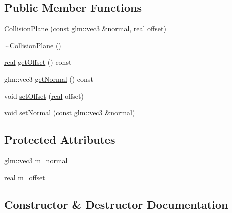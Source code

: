 \subsection*{Public Member Functions}
\begin{DoxyCompactItemize}
\item 
\mbox{\hyperlink{classrum_1_1_collision_plane_acb1374bc8962e6f0e14a93c041ade93f}{Collision\+Plane}} (const glm\+::vec3 \&normal, \mbox{\hyperlink{namespacerum_a7e8cca23573d5eaead0f138cbaa4862c}{real}} offset)
\item 
\mbox{\hyperlink{classrum_1_1_collision_plane_aed3fc45bbe236d0e3674745ed511ea14}{$\sim$\+Collision\+Plane}} ()
\item 
\mbox{\hyperlink{namespacerum_a7e8cca23573d5eaead0f138cbaa4862c}{real}} \mbox{\hyperlink{classrum_1_1_collision_plane_a348709c5d226023ce51d17a0fdfbe408}{get\+Offset}} () const
\item 
glm\+::vec3 \mbox{\hyperlink{classrum_1_1_collision_plane_a699fae9d74e6e19c4e30870d538c3a71}{get\+Normal}} () const
\item 
void \mbox{\hyperlink{classrum_1_1_collision_plane_aeaa1d14df4d33c30a7495e72ff5fa454}{set\+Offset}} (\mbox{\hyperlink{namespacerum_a7e8cca23573d5eaead0f138cbaa4862c}{real}} offset)
\item 
void \mbox{\hyperlink{classrum_1_1_collision_plane_ade1d578943c87eba3f49134f6e19148d}{set\+Normal}} (const glm\+::vec3 \&normal)
\end{DoxyCompactItemize}
\subsection*{Protected Attributes}
\begin{DoxyCompactItemize}
\item 
glm\+::vec3 \mbox{\hyperlink{classrum_1_1_collision_plane_aa2f3d73f116cb6965cd561f25ea4b67e}{m\+\_\+normal}}
\item 
\mbox{\hyperlink{namespacerum_a7e8cca23573d5eaead0f138cbaa4862c}{real}} \mbox{\hyperlink{classrum_1_1_collision_plane_a0630544f46ad1830d7f73f94746f1f25}{m\+\_\+offset}}
\end{DoxyCompactItemize}


\subsection{Constructor \& Destructor Documentation}
\mbox{\label{classrum_1_1_collision_plane_acb1374bc8962e6f0e14a93c041ade93f}} 
